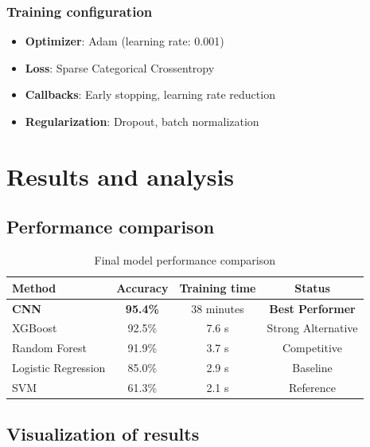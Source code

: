 \documentclass[11pt]{article}
\begin{document}
\subsubsection{Training configuration}
\begin{itemize}
    \item \textbf{Optimizer}: Adam (learning rate: 0.001)
    \item \textbf{Loss}: Sparse Categorical Crossentropy
    \item \textbf{Callbacks}: Early stopping, learning rate reduction
    \item \textbf{Regularization}: Dropout, batch normalization
\end{itemize}

\section{Results and analysis}

\subsection{Performance comparison}

\begin{table}[H]
\centering
\caption{Final model performance comparison}
\begin{tabular}{lccc}
\toprule
\textbf{Method} & \textbf{Accuracy} & \textbf{Training time} & \textbf{Status} \\
\midrule
\textbf{CNN} & \textbf{95.4\%} & 38 minutes & \textbf{Best Performer} \\
XGBoost & 92.5\% & 7.6 s & Strong Alternative \\
Random Forest & 91.9\% & 3.7 s & Competitive \\
Logistic Regression & 85.0\% & 2.9 s & Baseline \\
SVM & 61.3\% & 2.1 s & Reference \\
\bottomrule
\end{tabular}
\end{table}

\subsection{Visualization of results}
\end{document}
